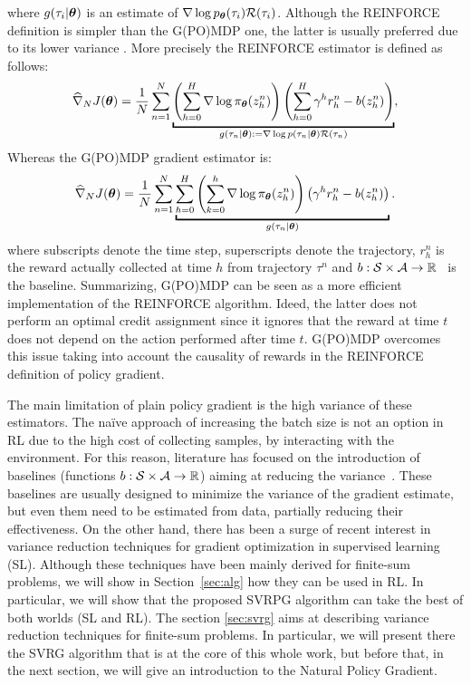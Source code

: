 where $g(\tau_i|\boldsymbol{\theta})$ is an estimate of $\nabla\log p_{\boldsymbol{\theta}}(\tau_i)\mathcal{R}(\tau_i)$.
Although the REINFORCE definition is simpler than the G(PO)MDP one, the latter is usually preferred due to its lower variance \citep{zhao2011analysis}. More precisely the REINFORCE estimator is defined as follows:
\begin{align*}
\gradApp{\vtheta}{N} = \frac{1}{N}\sum_{n=1}^{N}
\underbracket{
	\left(\sum_{h=0}^{H}\nabla \log \pol(z_h^n) \right)\left(\sum_{h=0}^{H}\gamma^h 
	r_h^n
	- b(z_h^n)\right)
}_{g(\tau_n|\vtheta):=\nabla \log p(\tau_n|\vtheta)\Reward(\tau_n)}
,
\end{align*}
Whereas the G(PO)MDP gradient estimator is:
\begin{align*}
\gradApp{\vtheta}{N} = \frac{1}{N}\sum_{n=1}^{N}
\underbracket{
	\sum_{h=0}^{H}\left(\sum_{k=0}^{h} \nabla \log \pol (z_h^n) \right)\left(\gamma^h 
	r_h^n
	- b(z^n_h)\right)
}_{g(\tau_n|\vtheta)}.
\end{align*}
where subscripts denote the time step, superscripts denote the trajectory, $r_h^n$ is the reward actually collected at time $h$ from trajectory $\tau^n$ and $b : \mathcal{S}\times\mathcal{A} \to \mathbb R$~\citep[\eg][]{Thomas2017actionbaseline} is the baseline.
Summarizing, G(PO)MDP can be seen as a more efficient implementation of the REINFORCE algorithm. 
Ideed, the latter does not perform an optimal credit assignment since it ignores that the reward at time $t$ does not depend on the action performed after time $t$.
G(PO)MDP overcomes this issue taking into account the causality of rewards in the REINFORCE definition of policy gradient.




The main limitation of plain policy gradient is the high variance of these estimators.
The na\"ive approach of increasing the batch size is not an option in \acs{RL} due to the high cost of collecting samples, \ie by interacting with the environment.
For this reason, literature has focused on the introduction of baselines (\ie functions $b : \mathcal{S} \times \mathcal{A} \to \mathbb R$) aiming at reducing the variance~\citep[\eg][]{williams1992simple,Peters2008reinf,Thomas2017actionbaseline,wu2018variance}.
These baselines are usually designed to minimize the variance of the gradient estimate, but even them need to be estimated from data, partially reducing their effectiveness.
On the other hand, there has been a surge of recent interest in variance reduction techniques for gradient optimization in supervised learning (\acs{SL}).
Although these techniques have been mainly derived for finite-sum problems, we will show in Section~\ref{sec:alg} how they can be used in \acs{RL}.
In particular, we will show that the proposed \acs{SVRPG} algorithm can take the best of both worlds (\ie \acs{SL} and \acs{RL}).
The section \ref{sec:svrg} aims at describing variance reduction techniques for finite-sum problems. In particular, we will present there the \acs{SVRG} algorithm that is at the core of this whole work, but before that, in the next section, we will give an introduction to the Natural Policy Gradient.


